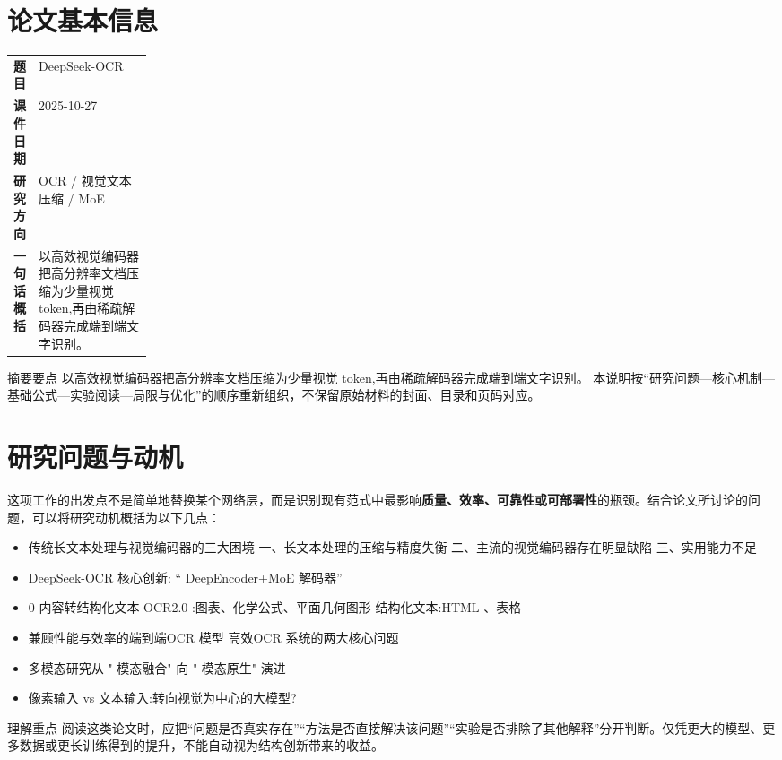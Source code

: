 \documentclass[UTF8,11pt,a4paper]{ctexart}
\newcommand{\term}[1]{\textbf{\textcolor{mainblue}{#1}}}
\begin{document}
\section{论文基本信息}
\begin{center}
\begin{tabularx}{0.94\linewidth}{>{\bfseries}p{0.18\linewidth}X}
\toprule
题目 & DeepSeek-OCR\\
课件日期 & 2025-10-27\\
研究方向 & OCR / 视觉文本压缩 / MoE\\
一句话概括 & 以高效视觉编码器把高分辨率文档压缩为少量视觉 token,再由稀疏解码器完成端到端文字识别。\\
\bottomrule
\end{tabularx}
\end{center}

\begin{infobox}{摘要要点}
以高效视觉编码器把高分辨率文档压缩为少量视觉 token,再由稀疏解码器完成端到端文字识别。 本说明按“研究问题—核心机制—基础公式—实验阅读—局限与优化”的顺序重新组织，不保留原始材料的封面、目录和页码对应。
\end{infobox}

\section{研究问题与动机}
这项工作的出发点不是简单地替换某个网络层，而是识别现有范式中最影响\term{质量、效率、可靠性或可部署性}的瓶颈。结合论文所讨论的问题，可以将研究动机概括为以下几点：
\begin{itemize}
\item 传统长文本处理与视觉编码器的三大困境 一、长文本处理的压缩与精度失衡 二、主流的视觉编码器存在明显缺陷 三、实用能力不足
\item DeepSeek-OCR 核心创新: “ DeepEncoder+MoE 解码器”
\item 0 内容转结构化文本 OCR2.0 :图表、化学公式、平面几何图形 结构化文本:HTML 、表格
\item 兼顾性能与效率的端到端OCR 模型 高效OCR 系统的两大核心问题
\item 多模态研究从 " 模态融合" 向 " 模态原生" 演进
\item 像素输入 vs 文本输入:转向视觉为中心的大模型?
\end{itemize}

\begin{notebox}{理解重点}
阅读这类论文时，应把“问题是否真实存在”“方法是否直接解决该问题”“实验是否排除了其他解释”分开判断。仅凭更大的模型、更多数据或更长训练得到的提升，不能自动视为结构创新带来的收益。
\end{notebox}
\end{document}
